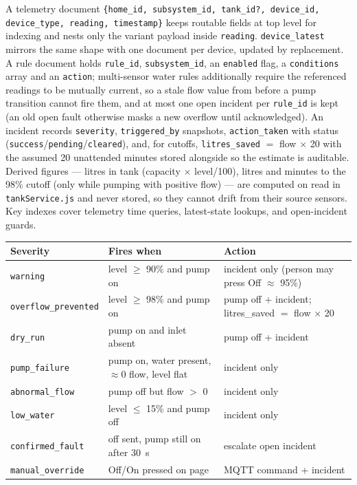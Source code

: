 \documentclass[11pt,a4paper]{article}
\begin{document}
A telemetry document \texttt{\{home\_id, subsystem\_id, tank\_id?, device\_id, device\_type, reading, timestamp\}} keeps routable fields at top level for indexing and nests only the variant payload inside \texttt{reading}. \texttt{device\_latest} mirrors the same shape with one document per device, updated by replacement. A rule document holds \texttt{rule\_id}, \texttt{subsystem\_id}, an \texttt{enabled} flag, a \texttt{conditions} array and an \texttt{action}; multi-sensor water rules additionally require the referenced readings to be mutually current, so a stale flow value from before a pump transition cannot fire them, and at most one open incident per \texttt{rule\_id} is kept (an old open fault otherwise masks a new overflow until acknowledged). An incident records \texttt{severity}, \texttt{triggered\_by} snapshots, \texttt{action\_taken} with status (\texttt{success}/\texttt{pending}/\texttt{cleared}), and, for cutoffs, \texttt{litres\_saved} $=$ flow $\times$ 20 with the assumed 20 unattended minutes stored alongside so the estimate is auditable. Derived figures --- litres in tank (capacity $\times$ level/100), litres and minutes to the 98\% cutoff (only while pumping with positive flow) --- are computed on read in \texttt{tankService.js} and never stored, so they cannot drift from their source sensors. Key indexes cover telemetry time queries, latest-state lookups, and open-incident guards.

\begin{center}
\small
\begin{tabularx}{\textwidth}{@{}lXX@{}}
\toprule
Severity & Fires when & Action \\
\midrule
\texttt{warning} & level $\ge$ 90\% and pump on & incident only (person may press Off $\approx$ 95\%) \\
\texttt{overflow\_prevented} & level $\ge$ 98\% and pump on & pump off + incident; litres\_saved $=$ flow $\times$ 20 \\
\texttt{dry\_run} & pump on and inlet absent & pump off + incident \\
\texttt{pump\_failure} & pump on, water present, $\approx$0 flow, level flat & incident only \\
\texttt{abnormal\_flow} & pump off but flow $>$ 0 & incident only \\
\texttt{low\_water} & level $\le$ 15\% and pump off & incident only \\
\texttt{confirmed\_fault} & off sent, pump still on after 30~s & escalate open incident \\
\texttt{manual\_override} & Off/On pressed on page & MQTT command + incident \\
\bottomrule
\end{tabularx}
\end{center}
\end{document}
